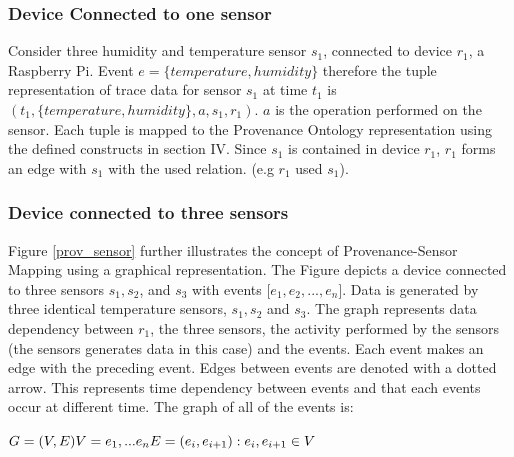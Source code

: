 \documentclass[conference]{IEEEtran}
\begin{document}





\subsubsection{Device Connected to one sensor} 

Consider three humidity and temperature sensor $s_1$, connected to device $r_1$, a Raspberry Pi. Event $e= \{temperature, humidity\}$ therefore the tuple representation of trace data for sensor $s_1$ at time $t_1$ is $(t_1, \{temperature, humidity\}, a,  s_1, r_1)$. $a$ is the operation performed on the sensor. Each tuple is mapped to the Provenance Ontology representation using the defined constructs in section IV. Since $s_1$ is contained in device $r_1$, $r_1$ forms an edge with $s_1$ with the used relation. (e.g $r_1$ used $s_1$). 


\subsubsection{Device connected to three sensors} 
Figure \ref{prov_sensor} further illustrates the concept of Provenance-Sensor Mapping using a graphical representation. The Figure depicts a device connected to three sensors $s_1, s_2$, and $s_3$ with events  [$e_1, e_2,...,e_n$]. Data is generated by three identical temperature sensors, $s_1, s_2$ and $s_3$. The graph represents data dependency between $r_1$, the three sensors, the activity performed by the sensors (the sensors generates data in this case) and the events.  Each event makes an edge with the preceding event. Edges between events are denoted with a dotted arrow. This represents time dependency between events and that each events occur at different time. The  graph of all of the events is:



\( \\ G = (V, E) \\ V =  { e_1, ...e_n } \\ E = { (e_i,e_{i+1}): e_i, e_{i+1} \in V} \) 
\end{document}
